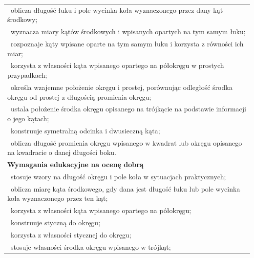 \documentclass[12pt,a4paper]{article}
\begin{document}
\begin{longtable}{|p{16cm}|}
		\textbullet\ oblicza długość łuku i pole wycinka koła wyznaczonego przez dany kąt środkowy; \\
		
		\textbullet\ wyznacza miary kątów środkowych i wpisanych opartych na tym samym łuku; \\
		
		\textbullet\ rozpoznaje kąty wpisane oparte na tym samym łuku i korzysta z równości ich miar; \\
		
		\textbullet\ korzysta z własności kąta wpisanego opartego na półokręgu w prostych przypadkach; \\
		
		\textbullet\ określa wzajemne położenie okręgu i prostej, porównując odległość środka okręgu od prostej z długością promienia okręgu; \\
		
		\textbullet\ ustala położenie środka okręgu opisanego na trójkącie na podstawie informacji o jego kątach; \\
		
		\textbullet\ konstruuje symetralną odcinka i dwusieczną kąta; \\
		
		\textbullet\ oblicza długość promienia okręgu wpisanego w kwadrat lub okręgu opisanego na kwadracie o danej długości boku. \\ \hline
		
		\textbf{Wymagania edukacyjne na ocenę dobrą} \\ \hline
		
		\textbullet\ stosuje wzory na długość okręgu i pole koła w sytuacjach praktycznych; \\
		
		\textbullet\ oblicza miarę kąta środkowego, gdy dana jest długość łuku lub pole wycinka koła wyznaczonego przez ten kąt; \\
		
		\textbullet\ korzysta z własności kąta wpisanego opartego na półokręgu; \\
		
		\textbullet\ konstruuje styczną do okręgu; \\
		
		\textbullet\ korzysta z własności stycznej do okręgu; \\
		
		\textbullet\ stosuje własności środka okręgu wpisanego w trójkąt; \\
		

\end{longtable}
\end{document}
